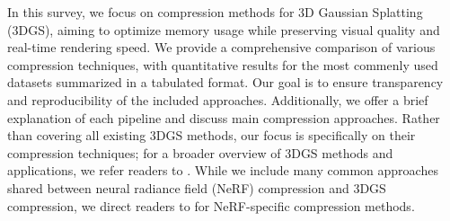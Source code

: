 \documentclass{article}
\begin{document}
In this survey, we focus on compression methods for 3D Gaussian Splatting (3DGS), aiming to optimize memory usage while preserving visual quality and real-time rendering speed. We provide a comprehensive comparison of various compression techniques, with quantitative results for the most commenly used datasets summarized in a tabulated format. Our goal is to ensure transparency and reproducibility of the included approaches. Additionally, we offer a brief explanation of each pipeline and discuss main compression approaches. Rather than covering all existing 3DGS methods, our focus is specifically on their compression techniques; for a broader overview of 3DGS methods and applications, we refer readers to \cite{wu2024recent,fei20243d}. While we include many common approaches shared between neural radiance field (NeRF)\cite{mildenhall2020nerf} compression and 3DGS compression, we direct readers to \cite{li2023compressing,chen2024far} for NeRF-specific compression methods.





\end{document}
